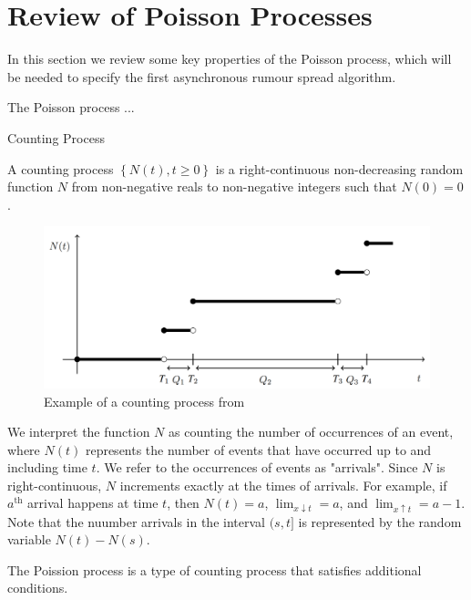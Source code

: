 \section{Review of Poisson Processes}

In this section we review some key properties of the Poisson process, which will be needed to specify the first asynchronous rumour spread algorithm.

The Poisson process ...
\begin{definition}
	Counting Process

	\noindent
	A counting process $\left\{ N(t), t \geq 0 \right\}$ is a right-continuous non-decreasing random function $N$ from non-negative reals to non-negative integers such that $N(0) = 0$.
\end{definition}

\begin{figure}[h]
	\centering
	\includegraphics[width=\textwidth]{./figures/poisson_process_example.png}
	\caption{Example of a counting process from \cite{countingProcessFigure}}
	\label{fig:poissonProcessExample}
\end{figure}


We interpret the function $N$ as counting the number of occurrences of an event, where $N(t)$ represents the number of events that have occurred up to and including time $t$. We refer to the occurrences of events as "arrivals".  Since $N$ is right-continuous, $N$ increments exactly at the times of arrivals. For example, if $a^\text{th}$ arrival happens at time $t$, then $N(t) = a$, $\lim_{x \downarrow t} = a$, and $\lim_{x \uparrow t} = a - 1$. Note that the nuumber arrivals in the interval $(s, t]$ is represented by the random variable $N(t) - N(s)$. 

The Poission process is a type of counting process that satisfies additional conditions. 

